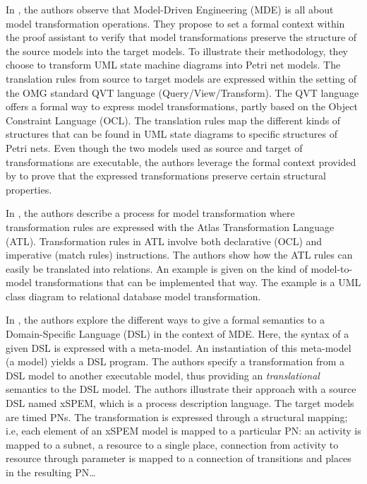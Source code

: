 \documentclass[pdflatex,sn-mathphys]{sn-jnl}%
\theoremstyle{thmstyleone}%
\theoremstyle{thmstyletwo}%
\theoremstyle{thmstylethree}%
\begin{document}
In \cite{Berramla2015}, the authors observe that Model-Driven
Engineering (MDE) is all about model transformation operations. They
propose to set a formal context within the \coq{} proof assistant to
verify that model transformations preserve the structure of the source
models into the target models. To illustrate their methodology, they
choose to transform UML state machine diagrams into Petri net
models. The translation rules from source to target models are
expressed within the setting of the OMG standard QVT language
(Query/View/Transform). The QVT language offers a formal way to
express model transformations, partly based on the Object Constraint
Language (OCL). The translation rules map the different kinds of
structures that can be found in UML state diagrams to specific
structures of Petri nets. Even though the two models used as source
and target of transformations are executable, the authors leverage the
formal context provided by \coq{} to prove that the expressed
transformations preserve certain structural properties.

In \cite{Calegari2011}, the authors describe a process for model
transformation where transformation rules are expressed with the Atlas
Transformation Language (ATL). Transformation rules in ATL involve
both declarative (OCL) and imperative (match rules) instructions. The
authors show how the ATL rules can easily be translated into \coq{}
relations. An example is given on the kind of model-to-model
transformations that can be implemented that way. The example is a UML
class diagram to relational database model transformation.

In \cite{Combemale2009}, the authors explore the different ways to
give a formal semantics to a Domain-Specific Language (DSL) in the
context of MDE. Here, the syntax of a given DSL is expressed with a
meta-model.  An instantiation of this meta-model (a model) yields a
DSL program. The authors specify a transformation from a DSL model to
another executable model, thus providing an \textit{translational}
semantics to the DSL model.  The authors illustrate their approach
with a source DSL named xSPEM, which is a process description
language. The target models are timed PNs. The transformation is
expressed through a structural mapping; i.e, each element of an xSPEM
model is mapped to a particular PN: an activity is mapped to a subnet,
a resource to a single place, connection from activity to resource
through parameter is mapped to a connection of transitions and places
in the resulting PN\dots 
\end{document}
